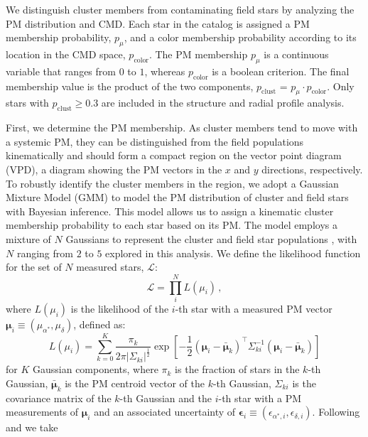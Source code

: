 \documentclass[12pt]{ucsddissertation}
\begin{document}
\begin{CJK*}{UTF8}{gbsn}
We distinguish cluster members from contaminating field stars by analyzing the PM distribution and CMD. Each star in the catalog is assigned a PM membership probability, $p_\mu$, and a color membership probability according to its location in the CMD space, $p_{\mathrm{color}}$. The PM membership $p_\mu$ is a continuous variable that ranges from $0$ to $1$, whereas $p_{\mathrm{color}}$ is a boolean criterion. The final membership value is the product of the two components, $p_{\mathrm{clust}}$ = $p_\mu \cdot p_{\mathrm{color}}$.  Only stars with $p_{\mathrm{clust}} \geq 0.3$ are included in the structure and radial profile analysis. 

First, we determine the PM membership. As cluster members tend to move with a systemic PM, they can be distinguished from the field populations kinematically and should form a compact region on the vector point diagram (VPD), a diagram showing the PM vectors in the $x$ and $y$ directions, respectively. To robustly identify the cluster members in the region, we adopt a Gaussian Mixture Model (GMM) to model the PM distribution of cluster and field stars with Bayesian inference. This model allows us to assign a kinematic cluster membership probability to each star based on its PM. The model employs a mixture of $N$ Gaussians to represent the cluster and field star populations \citep[see][for details]{Clarkson-2012, Hosek-2015, Rui-2019}, with $N$ ranging from $2$ to $5$ explored in this analysis. We define the likelihood function for the set of $N$ measured stars, $\mathcal{L}$: 
\begin{equation}
    \mathcal{L} = \prod_i^N L(\mu_i)\,,
\end{equation}
where $L(\mu_i)$ is the likelihood of the $i$-th star with a measured PM vector $\boldsymbol{\mu}_i \equiv \left(\mu_{\alpha^*}, \mu_\delta\right)$, defined as:
\begin{equation}
    L(\mu_i) = \sum_{k=0}^K \frac{\pi_k}{2\pi|\Sigma_{ki}|^\frac{1}{2}}\exp{\left[-\frac{1}{2}(\boldsymbol{\mu}_i - \bar{\boldsymbol{\mu}}_k)^\top\Sigma_{ki}^{-1}(\boldsymbol{\mu}_i - \bar{\boldsymbol{\mu}}_k)\right]}
\end{equation}
for $K$ Gaussian components, where $\pi_k$ is the fraction of stars in the $k$-th Gaussian, $\bar{\boldsymbol{\mu}}_k$ is the PM centroid vector of the $k$-th Gaussian, $\Sigma_{ki}$ is the covariance matrix of the $k$-th Gaussian and the $i$-th star with a PM measurements of $\boldsymbol{\mu}_i$ and an associated uncertainty of $\boldsymbol{\epsilon}_i \equiv \left(\epsilon_{\alpha^*, i}, \epsilon_{\delta, i}\right)$. Following \citet{Hosek-2015} and \citet{Clarkson-2012} we take 

\end{CJK*}
\end{document}
